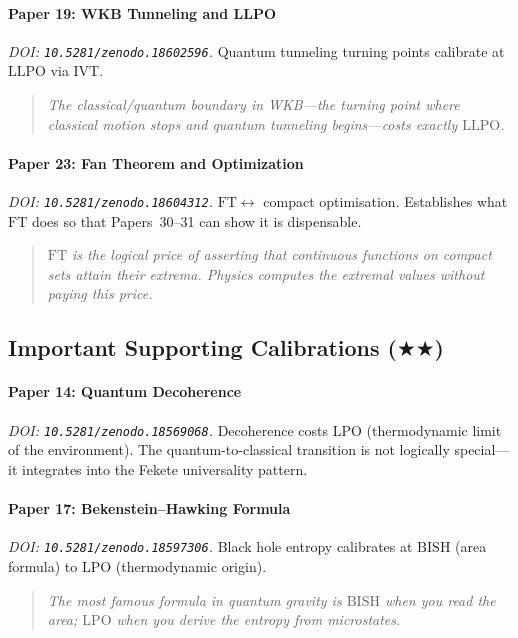 \documentclass[11pt,a4paper]{report}
\theoremstyle{plain}
\theoremstyle{definition}
\theoremstyle{remark}
\newcommand{\BISH}{\mathrm{BISH}}
\newcommand{\LLPO}{\mathrm{LLPO}}
\newcommand{\LPO}{\mathrm{LPO}}
\newcommand{\FT}{\mathrm{FT}}
\newcommand{\TwoStar}{$\bigstar\bigstar$}
\begin{document}
\paragraph{Paper 19: WKB Tunneling and LLPO}
\emph{DOI: \texttt{10.5281/zenodo.18602596}.}\quad
Quantum tunneling turning points calibrate at $\LLPO$ via IVT.
\begin{quote}\itshape
The classical/quantum boundary in WKB---the turning point where classical motion stops and quantum tunneling begins---costs exactly $\LLPO$.
\end{quote}

\paragraph{Paper 23: Fan Theorem and Optimization}
\emph{DOI: \texttt{10.5281/zenodo.18604312}.}\quad
$\FT \leftrightarrow$ compact optimisation.  Establishes what $\FT$ does so that Papers~30--31 can show it is dispensable.
\begin{quote}\itshape
$\FT$ is the logical price of asserting that continuous functions on compact sets attain their extrema.  Physics computes the extremal values without paying this price.
\end{quote}

\subsection{Important Supporting Calibrations {\normalfont(\TwoStar)}}

\paragraph{Paper 14: Quantum Decoherence}
\emph{DOI: \texttt{10.5281/zenodo.18569068}.}\quad
Decoherence costs $\LPO$ (thermodynamic limit of the environment).  The quantum-to-classical transition is not logically special---it integrates into the Fekete universality pattern.

\paragraph{Paper 17: Bekenstein--Hawking Formula}
\emph{DOI: \texttt{10.5281/zenodo.18597306}.}\quad
Black hole entropy calibrates at $\BISH$ (area formula) to $\LPO$ (thermodynamic origin).
\begin{quote}\itshape
The most famous formula in quantum gravity is $\BISH$ when you read the area; $\LPO$ when you derive the entropy from microstates.
\end{quote}
\end{document}
